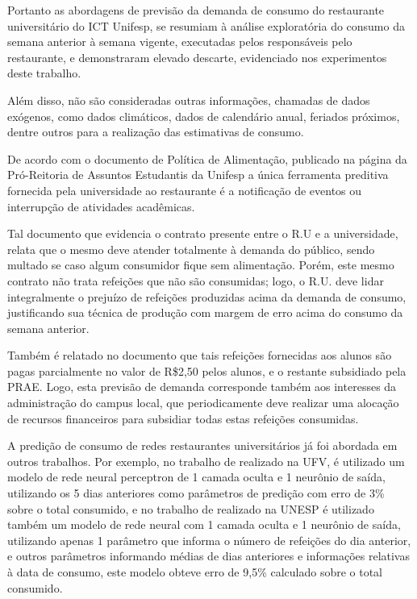Portanto as abordagens de previsão da demanda de consumo do restaurante universitário do ICT Unifesp, se resumiam à análise exploratória do consumo da semana anterior à semana vigente, executadas pelos responsáveis pelo restaurante, e demonstraram elevado descarte, evidenciado nos experimentos deste trabalho.

Além disso, não são consideradas outras informações, chamadas de dados exógenos, como dados climáticos, dados de calendário anual, feriados próximos, dentre outros para a realização das estimativas de consumo.

De acordo com o documento de Política de Alimentação, publicado na página da Pró-Reitoria de Assuntos Estudantis da Unifesp \cite{unifesp_Alimentacao} a única ferramenta preditiva fornecida pela universidade ao restaurante é a notificação de eventos ou interrupção de atividades acadêmicas.

Tal documento que evidencia o contrato presente entre o R.U e a universidade, relata que o mesmo deve atender totalmente à demanda do público, sendo multado se caso algum consumidor fique sem alimentação. Porém, este mesmo contrato não trata refeições que não são consumidas; logo, o R.U. deve lidar integralmente o prejuízo de refeições produzidas acima da demanda de consumo, justificando sua técnica de produção com margem de erro acima do consumo da semana anterior.

Também é relatado no documento que tais refeições fornecidas aos alunos são pagas parcialmente no valor de R\$2,50 pelos alunos, e o restante subsidiado pela PRAE. Logo, esta previsão de demanda corresponde também aos interesses da administração do campus local, que periodicamente deve realizar uma alocação de recursos financeiros para subsidiar todas estas refeições consumidas. 

A predição de consumo de redes restaurantes universitários já foi abordada em outros trabalhos. Por exemplo, no trabalho de  \cite{Lopes2008} realizado na UFV, é utilizado um modelo de rede neural perceptron de 1 camada oculta e 1 neurônio de saída, utilizando os 5 dias anteriores como parâmetros de predição com erro de 3\% sobre o total consumido, e no trabalho de \cite{Rocha2011} realizado na UNESP é utilizado também um modelo de rede neural com 1 camada oculta e 1 neurônio de saída, utilizando apenas 1 parâmetro que informa o número de refeições do dia anterior, e outros parâmetros informando médias de dias anteriores e informações relativas à data de consumo, este modelo obteve erro de 9,5\% calculado sobre o total consumido.

